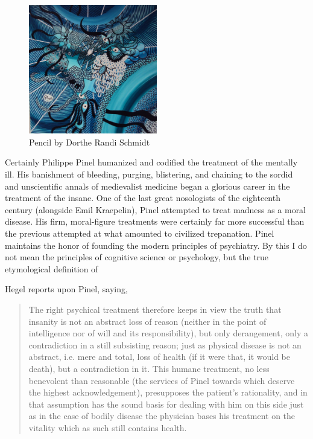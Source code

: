 \documentclass[]{article}
\begin{document}
		\begin{figure}
			\centering
			\includegraphics[width=0.5\textwidth]{graphics/DortheRandiSchmidt1}
			\caption{Pencil by Dorthe Randi Schmidt}
		\end{figure}
		
		
		Certainly Philippe Pinel humanized and codified the treatment of the mentally ill. His banishment of bleeding, purging, blistering, and chaining to the sordid and unscientific annals of medievalist medicine began a glorious career in the treatment of the insane. One of the last great nosologists of the eighteenth century (alongside Emil Kraepelin), Pinel attempted to treat madness as a moral disease. His firm, moral-figure treatments were certainly far more successful than the previous attempted at what amounted to civilized trepanation. Pinel maintains the honor of founding the modern principles of psychiatry. By this I do not mean the principles of cognitive science or psychology, but the true etymological definition of 
		
		\FloatBarrier
		
		Hegel reports upon Pinel, saying,
		
		\begin{quote}
			The right psychical treatment therefore keeps in view the truth that insanity is not an abstract loss of reason (neither in the point of intelligence nor of will and its responsibility), but only derangement, only a contradiction in a still subsisting reason; just as physical disease is not an abstract, i.e. mere and total, loss of health (if it were that, it would be death), but a contradiction in it. This humane treatment, no less benevolent than reasonable (the services of Pinel towards which deserve the highest acknowledgement), presupposes the patient's rationality, and in that assumption has the sound basis for dealing with him on this side just as in the case of bodily disease the physician bases his treatment on the vitality which as such still contains health.
		\end{quote}
		
\end{document}
